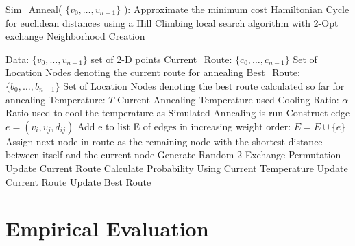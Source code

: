 \documentclass[format=sigconf]{acmart}
\begin{document}
\begin{algorithm}
	\caption{  Sim\_Anneal( $\{v_0, \hdots, v_{n-1}\}$ ): Approximate the minimum cost Hamiltonian Cycle for euclidean distances using a Hill Climbing local search algorithm with 2-Opt exchange Neighborhood Creation}
	\begin{algorithmic} 
		\STATE Data: $\{v_0, \hdots, v_{n-1}\}$ set of 2-D points
		\STATE Current\_Route: $\{c_0, \hdots, c_{n-1}\}$ Set of Location Nodes denoting the current route for annealing
		\STATE Best\_Route: $\{b_0, \hdots, b_{n-1}\}$ Set of Location Nodes denoting the best route calculated so far for annealing
		\STATE Temperature: $T$ Current Annealing Temperature used
		\STATE Cooling Ratio: $\alpha$ Ratio used to cool the temperature as Simulated Annealing is run
			\STATE Construct edge $e = (v_i, v_j, d_{ij})$
			\STATE Add e to list E of edges in increasing weight order: $E = E \cup \{e\}$
		\ENDFOR
			\STATE Assign next node in route as the remaining node with the shortest distance between itself and the current node
		\ENDWHILE
			\STATE Generate Random 2 Exchange Permutation
				\STATE Update Current Route
			\ELSE
				\STATE Calculate Probability Using Current Temperature
					\STATE Update Current Route
				\ENDIF
			\ENDIF
				\STATE Update Best Route
			\ENDIF
		\ENDWHILE
	\end{algorithmic}
\end{algorithm}
\section*{Empirical Evaluation}
\end{document}
